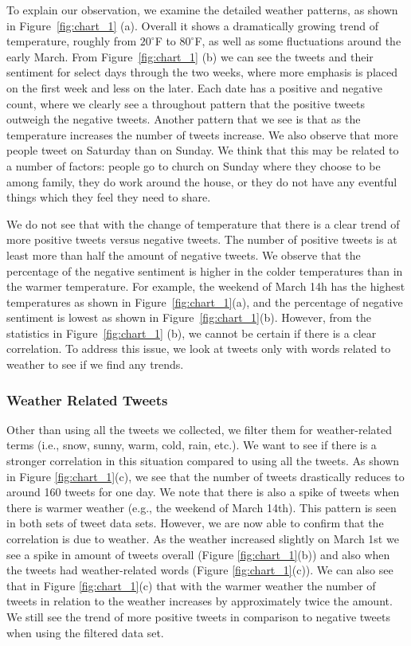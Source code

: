 To explain our observation, we examine the detailed weather patterns, as shown in Figure~\ref{fig:chart_1} (a). Overall it shows a dramatically growing trend of temperature, roughly from $20^\circ$F to $80^\circ$F, as well as some fluctuations around the early March. From Figure~\ref{fig:chart_1} (b) we can see the tweets and their sentiment for select days through the two weeks, where more emphasis is placed on the first week and less on the later. Each date has a positive and negative count, where we clearly see a throughout pattern that the positive tweets outweigh the negative tweets. Another pattern that we see is that as the temperature increases the number of tweets increase. We also observe that more people tweet on Saturday than on Sunday. We think that this may be related to a number of factors: people go to church on Sunday where they choose to be among family, they do work around the house, or they do not have any eventful things which they feel they need to share.

We do not see that with the change of temperature that there is a clear trend of more positive tweets versus negative tweets. The number of positive tweets is at least more than half the amount of negative tweets. We observe that the percentage of the negative sentiment is higher in the colder temperatures than in the warmer temperature. For example, the weekend of March 14h has the highest temperatures as shown in Figure~\ref{fig:chart_1}(a), and the percentage of negative sentiment is lowest as shown in Figure~\ref{fig:chart_1}(b). However, from the statistics in Figure~\ref{fig:chart_1} (b), we cannot be certain if there is a clear correlation. To address this issue, we look at tweets only with words related to weather to see if we find any trends.

\subsubsection{Weather Related Tweets}

Other than using all the tweets we collected, we filter them for weather-related terms (i.e., snow, sunny, warm, cold, rain, etc.). We want to see if there is a stronger correlation in this situation compared to using all the tweets. %
As shown in Figure \ref{fig:chart_1}(c), we see that the number of tweets drastically reduces to around 160 tweets for one day.
We note that there is also a spike of tweets when there is warmer weather (e.g., the weekend of March 14th). This pattern is seen in both sets of tweet data sets. However, we are now able to confirm that the correlation is due to weather. As the weather increased slightly on March 1st we see a spike in amount of tweets overall (Figure \ref{fig:chart_1}(b)) and also when the tweets had weather-related words (Figure \ref{fig:chart_1}(c)). We can also see that in Figure \ref{fig:chart_1}(c) that with the warmer weather the number of tweets in relation to the weather increases by approximately twice the amount. We still see the trend of more positive tweets in comparison to negative tweets when using the filtered data set.

